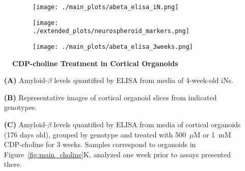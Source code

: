 \begin{figure}[H]
    \begin{subfigure}[t]{0.5\textwidth}
        \caption{}
        \texttt{[image: ./main\_plots/abeta\_elisa\_iN.png]}        
    \end{subfigure}  
    \par
    \begin{subfigure}[t]{0.7\textwidth}
        \caption{}
        \texttt{[image: ./extended\_plots/neurospheroid\_markers.png]}        
    \end{subfigure}
    \par
    \begin{subfigure}[t]{0.7\textwidth}
        \caption{}
        \texttt{[image: ./main\_plots/abeta\_elisa\_3weeks.png]}        
    \end{subfigure}
    \caption{
        \textbf{CDP-choline Treatment in Cortical Organoids}\\
    }
    \label{fig:neurospheroid_figure}
\end{figure}
\begin{itemize}
    \item[\textbf{(A)}] Amyloid-$\beta$ levels quantified by ELISA from media of 4-week-old iNs.
    \item[\textbf{(B)}] Representative images of cortical organoid slices from indicated genotypes.
    \item[\textbf{(C)}] Amyloid-$\beta$ levels quantified by ELISA from media of cortical organoids (176 days old), grouped by genotype and treated with 500~$\mu$M or 1~mM CDP-choline for 3 weeks. Samples correspond to organoids in Figure~\ref{fig:main_choline}K, analyzed one week prior to assays presented there.
\end{itemize}